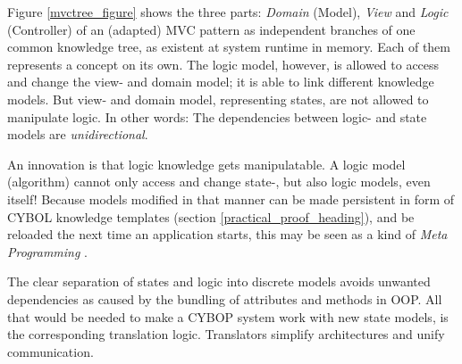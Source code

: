 Figure \ref{mvctree_figure} shows the three parts: \emph{Domain} (Model),
\emph{View} and \emph{Logic} (Controller) of an (adapted) MVC pattern as
independent branches of one common knowledge tree, as existent at system
runtime in memory. Each of them represents a concept on its own. The logic
model, however, is allowed to access and change the view- and domain model; it
is able to link different knowledge models. But view- and domain model,
representing states, are not allowed to manipulate logic. In other words: The
dependencies between logic- and state models are \emph{unidirectional}.

An innovation is that logic knowledge gets manipulatable. A logic model
(algorithm) cannot only access and change state-, but also logic models, even
itself! Because models modified in that manner can be made persistent in form
of CYBOL knowledge templates (section \ref{practical_proof_heading}), and be
reloaded the next time an application starts, this may be seen as a kind of
\emph{Meta Programming} \cite{wikipedia}.

The clear separation of states and logic into discrete models avoids unwanted
dependencies as caused by the bundling of attributes and methods in OOP. All
that would be needed to make a CYBOP system work with new state models, is the
corresponding translation logic. Translators \cite{hellerkunze} simplify
architectures and unify communication.
